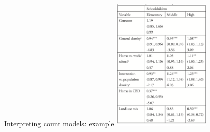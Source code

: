 \begin{frame}{Interpreting count models: example}
  \centering\includegraphics[width=0.35\textwidth]{img/salon_count.png}\\
  {\tiny\textcite{salon_heterogeneity_2019}}
\end{frame}
